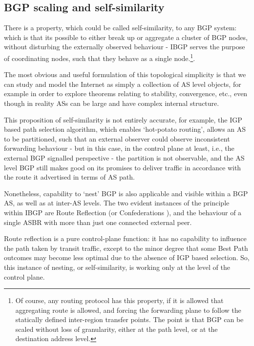 \subsection{BGP scaling and self-similarity}

There is a property, which could be called self-similarity, to any BGP system: which is that its possible to either break up or aggregate a cluster of BGP nodes, without disturbing the externally observed behaviour - IBGP serves the purpose of coordinating nodes, such that they behave as a single node.\footnote{Of course, any routing protocol has this property, if it is allowed that aggregating route is allowed, and forcing the forwarding plane to follow the statically defined inter-region transfer points.  The point is that BGP can be scaled without loss of granularity, either at the path level, or at the destination address level.}.
\medskip

The most obvious and useful formulation of this topological simplicity is that we can study and model the Internet as simply a collection of AS level objects, for example in order to explore theorems relating to stability, convergence, etc., even though in reality ASs can be large and have complex internal structure.

This proposition of self-similarity is not entirely accurate, for example, the IGP based path selection algorithm, which enables `hot-potato routing', allows an AS to be partitioned, such that an external observer could observe inconsistent forwarding behaviour - but in this case, in the control plane at least, i.e., the external BGP signalled perspective - the partition is not observable, and the AS level BGP still makes good on its promises to deliver traffic in accordance with the route it advertised in terms of AS path.

Nonetheless, capability to `nest' BGP is also applicable and visible within a BGP AS, as well as at inter-AS levels.  The two evident instances of the principle within IBGP are Route Reflection (or Confederations ), and the behaviour of a single ASBR with more than just one connected external peer.

Route reflection is a pure control-plane function: it has no capability to influence the path taken by transit traffic, except to the minor degree that some Best Path outcomes may become less optimal due to the absence of IGP based selection.
So, this instance of nesting, or self-similarity, is working only at the level of the control plane.

